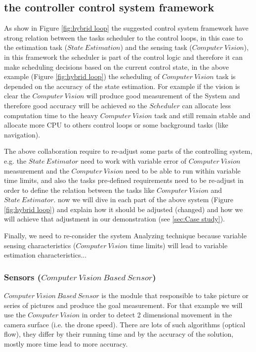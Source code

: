 \documentclass[11pt]{article}
\begin{document}
\subsection{the controller control system framework}
\label{sec:our proposal}

As show in Figure \ref{fig:hybrid loop} the suggested control system framework have strong relation between the tasks scheduler to the control loops, in this case to the estimation task ($State~Estimation$) and the sensing task ($Computer~Vision$), 
in this framework the scheduler is part of the control logic and therefore it can make scheduling decisions based on the current control state, in the above example (Figure \ref{fig:hybrid loop}) the scheduling of $Computer~Vision$ task is depended on the accuracy of the state estimation.
For example if the vision is clear the $Computer~Vision$ will produce good measurement of the System and therefore good accuracy will be achieved so the $Scheduler$ can allocate less computation time to the heavy $Computer~Vision$ task and still remain stable and allocate more CPU to others control loops or some background tasks (like navigation).

The above collaboration require to re-adjust some parts of the controlling system, e.g. the $State~Estimator$ need to work with variable error of $Computer~Vision$ measurement and the $Computer~Vision$ need to be able to run within variable time limits, and also the tasks pre-defined requirements need to be re-adjust in order to define the relation between the tasks like $Computer~Vision$ and $State~Estimator$.
now we will dive in each part of the above system (Figure \ref{fig:hybrid loop}) and explain how it should be adjusted (changed) and how we will achieve that adjustment in our demonstration (see \ref{sec:Case study}).

Finally, we need to re-consider the system Analyzing technique because variable sensing characteristics ($Computer~Vision$ time limits) will lead to variable estimation characteristics... %

\subsubsection{Sensors ($Computer~Vision~Based~Sensor$)}
\label{sec:sensors}

$Computer~Vision~Based~Sensor$ is the module that responsible to take picture or series of pictures and produce the goal measurement.
For that example we will use the $Computer~Vision$ in order to detect 2 dimensional movement in the camera surface (i.e. the drone speed).
There are lots of such algorithms (optical flow), they differ by their running time and by the accuracy of the solution, mostly more time lead to more accuracy.
\end{document}
